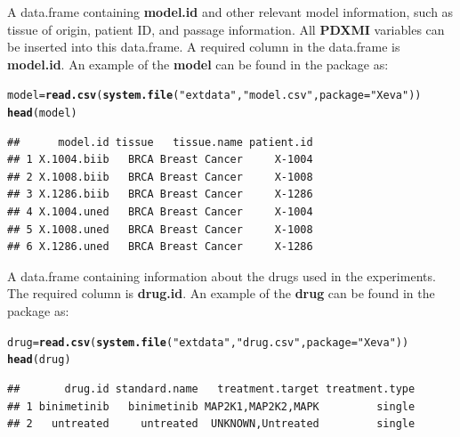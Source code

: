 \documentclass{article}\usepackage[]{graphicx}\usepackage[]{xcolor}
\makeatletter
\newcommand{\hlstr}[1]{\textcolor[rgb]{0.192,0.494,0.8}{#1}}%
\newcommand{\hlstd}[1]{\textcolor[rgb]{0.345,0.345,0.345}{#1}}%
\newcommand{\hlkwb}[1]{\textcolor[rgb]{0.69,0.353,0.396}{#1}}%
\newcommand{\hlkwc}[1]{\textcolor[rgb]{0.333,0.667,0.333}{#1}}%
\newcommand{\hlkwd}[1]{\textcolor[rgb]{0.737,0.353,0.396}{\textbf{#1}}}%
\newenvironment{kframe}{%
 \def\at@end@of@kframe{}%
 \ifinner\ifhmode%
  \def\at@end@of@kframe{\end{minipage}}%
  \begin{minipage}{\columnwidth}%
 \fi\fi%
 \def\FrameCommand##1{\hskip\@totalleftmargin \hskip-\fboxsep
 \colorbox{shadecolor}{##1}\hskip-\fboxsep
     \hskip-\linewidth \hskip-\@totalleftmargin \hskip\columnwidth}%
 \MakeFramed {\advance\hsize-\width
   \@totalleftmargin\z@ \linewidth\hsize
   \@setminipage}}%
 {\par\unskip\endMakeFramed%
 \at@end@of@kframe}
\newenvironment{knitrout}{}{} %
\makeatother
\begin{document}
\begin{description}
\setlength\itemsep{2em}

\item[model]
A data.frame containing \textbf{model.id} and other relevant
model information, such as tissue of origin, patient ID, and passage information.
All \textbf{PDXMI} variables can be inserted into this data.frame.
A required column in the data.frame is \textbf{model.id}.
An example of the \textbf{model} can be found in the package as:
\begin{knitrout}
\color{fgcolor}\begin{kframe}
\begin{alltt}
\hlstd{model}\hlkwb{=}\hlkwd{read.csv}\hlstd{(}\hlkwd{system.file}\hlstd{(}\hlstr{"extdata"}\hlstd{,} \hlstr{"model.csv"}\hlstd{,} \hlkwc{package} \hlstd{=} \hlstr{"Xeva"}\hlstd{))}
\hlkwd{head}\hlstd{(model)}
\end{alltt}
\begin{verbatim}
##      model.id tissue   tissue.name patient.id
## 1 X.1004.biib   BRCA Breast Cancer     X-1004
## 2 X.1008.biib   BRCA Breast Cancer     X-1008
## 3 X.1286.biib   BRCA Breast Cancer     X-1286
## 4 X.1004.uned   BRCA Breast Cancer     X-1004
## 5 X.1008.uned   BRCA Breast Cancer     X-1008
## 6 X.1286.uned   BRCA Breast Cancer     X-1286
\end{verbatim}
\end{kframe}
\end{knitrout}

\item[drug]
A data.frame containing information about the drugs used in the experiments.
The required column is \textbf{drug.id}.
An example of the \textbf{drug} can be found in the package as:
\begin{knitrout}
\color{fgcolor}\begin{kframe}
\begin{alltt}
\hlstd{drug}\hlkwb{=}\hlkwd{read.csv}\hlstd{(}\hlkwd{system.file}\hlstd{(}\hlstr{"extdata"}\hlstd{,} \hlstr{"drug.csv"}\hlstd{,} \hlkwc{package} \hlstd{=} \hlstr{"Xeva"}\hlstd{))}
\hlkwd{head}\hlstd{(drug)}
\end{alltt}
\begin{verbatim}
##       drug.id standard.name   treatment.target treatment.type
## 1 binimetinib   binimetinib MAP2K1,MAP2K2,MAPK         single
## 2   untreated     untreated  UNKNOWN,Untreated         single
\end{verbatim}
\end{kframe}
\end{knitrout}


\end{description}
\end{document}
